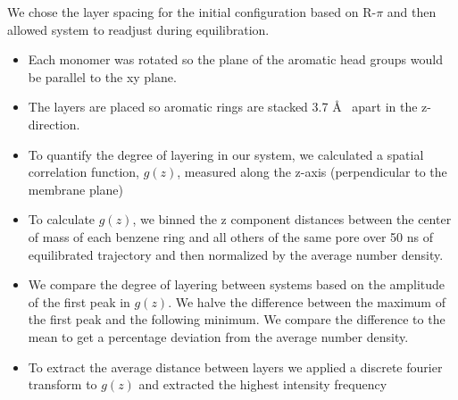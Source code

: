 \documentclass{article}
\newcommand{\angstrom}{\textup{\AA}}
\begin{document}
  We chose the layer spacing for the initial configuration based on R-$\pi$ and then allowed system
  to readjust during equilibration.
  \begin{itemize}  
    \item Each monomer was rotated so the plane of the aromatic head groups would
    be parallel to the xy plane.
    \item The layers are placed so aromatic rings are stacked 3.7 \angstrom~
    apart in the z-direction.
    \item To quantify the degree of layering in our system, we calculated
    a spatial correlation function, $g(z)$, measured along the z-axis 
    (perpendicular to the membrane plane)
    \item To calculate $g(z)$, we binned the z component distances between 
    the center of mass of each benzene ring and all others of the same pore 
    over 50 ns of equilibrated trajectory and then normalized by the average
    number density.
    \item We compare the degree of layering between systems based on the
    amplitude of the first peak in $g(z)$. We halve the difference between the
    maximum of the first peak and the following minimum. We compare the difference
    to the mean to get a percentage deviation from the average number density.
    \item To extract the average distance between layers we applied a discrete 
    fourier transform to $g(z)$ and extracted the highest intensity frequency 
  \end{itemize}
\end{document}
